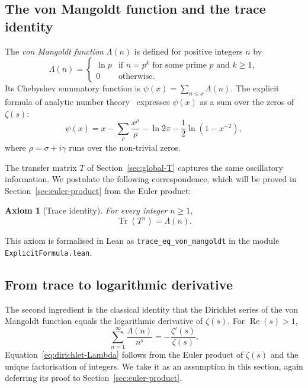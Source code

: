 \documentclass[11pt,reqno]{amsart}
\newtheorem{axiom}[theorem]{Axiom}
\theoremstyle{definition}
\theoremstyle{remark}
\begin{document}
\subsection{The von Mangoldt function and the trace identity}
\label{sec:von-mangoldt}

The \emph{von Mangoldt function} \(\Lambda(n)\) is defined for positive integers \(n\) by
\begin{equation}\label{eq:Lambda}
\Lambda(n) = \begin{cases}
\ln p & \text{if } n = p^k \text{ for some prime } p \text{ and } k\ge 1,\\
0 & \text{otherwise}.
\end{cases}
\end{equation}
Its Chebyshev summatory function is \(\psi(x)=\sum_{n\le x}\Lambda(n)\).  The explicit formula of analytic number theory~\cite{ingham1932,davenport2000} expresses \(\psi(x)\) as a sum over the zeros of \(\zeta(s)\):
\[
\psi(x) = x - \sum_{\rho}\frac{x^{\rho}}{\rho} - \ln 2\pi - \frac12\ln(1-x^{-2}),
\]
where \(\rho=\sigma+i\gamma\) runs over the non‑trivial zeros.

The transfer matrix \(T\) of Section~\ref{sec:global-T} captures the same oscillatory information.  We postulate the following correspondence, which will be proved in Section~\ref{sec:euler-product} from the Euler product:

\begin{axiom}[Trace identity]\label{ax:trace}
For every integer \(n\ge 1\),
\[
\operatorname{Tr}(T^n) = \Lambda(n).
\]
\end{axiom}

This axiom is formalised in Lean as \texttt{trace\_eq\_von\_mangoldt} in the module \texttt{ExplicitFormula.lean}.

\subsection{From trace to logarithmic derivative}
\label{sec:dirichlet-series}

The second ingredient is the classical identity that the Dirichlet series of the von Mangoldt function equals the logarithmic derivative of \(\zeta(s)\).  For \(\operatorname{Re}(s)>1\),
\begin{equation}\label{eq:dirichlet-Lambda}
\sum_{n=1}^{\infty}\frac{\Lambda(n)}{n^s} = -\frac{\zeta'(s)}{\zeta(s)}.
\end{equation}
Equation~\eqref{eq:dirichlet-Lambda} follows from the Euler product of \(\zeta(s)\) and the unique factorisation of integers.  We take it as an assumption in this section, again deferring its proof to Section~\ref{sec:euler-product}.
\end{document}
